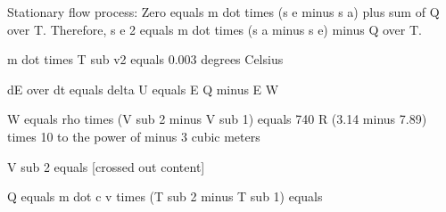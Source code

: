 Stationary flow process:
Zero equals m dot times (s e minus s a) plus sum of Q over T.
Therefore, s e 2 equals m dot times (s a minus s e) minus Q over T.

m dot times T sub v2 equals 0.003 degrees Celsius

dE over dt equals delta U equals E Q minus E W

W equals rho times (V sub 2 minus V sub 1) equals 740 R (3.14 minus 7.89) times 10 to the power of minus 3 cubic meters

V sub 2 equals [crossed out content]

Q equals m dot c v times (T sub 2 minus T sub 1) equals